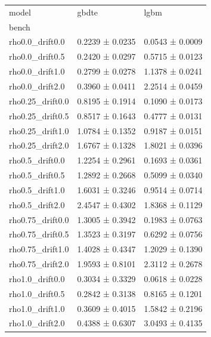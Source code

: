 \begin{tabular}{lll}
\toprule
model & gbdte & lgbm \\
bench &  &  \\
\midrule
rho0.0_drift0.0 & 0.2239 ± 0.0235 & 0.0543 ± 0.0009 \\
rho0.0_drift0.5 & 0.2420 ± 0.0297 & 0.5715 ± 0.0123 \\
rho0.0_drift1.0 & 0.2799 ± 0.0278 & 1.1378 ± 0.0241 \\
rho0.0_drift2.0 & 0.3960 ± 0.0411 & 2.2514 ± 0.0459 \\
rho0.25_drift0.0 & 0.8195 ± 0.1914 & 0.1090 ± 0.0173 \\
rho0.25_drift0.5 & 0.8517 ± 0.1643 & 0.4777 ± 0.0131 \\
rho0.25_drift1.0 & 1.0784 ± 0.1352 & 0.9187 ± 0.0151 \\
rho0.25_drift2.0 & 1.6767 ± 0.1328 & 1.8021 ± 0.0396 \\
rho0.5_drift0.0 & 1.2254 ± 0.2961 & 0.1693 ± 0.0361 \\
rho0.5_drift0.5 & 1.2892 ± 0.2668 & 0.5099 ± 0.0340 \\
rho0.5_drift1.0 & 1.6031 ± 0.3246 & 0.9514 ± 0.0714 \\
rho0.5_drift2.0 & 2.4547 ± 0.4302 & 1.8368 ± 0.1129 \\
rho0.75_drift0.0 & 1.3005 ± 0.3942 & 0.1983 ± 0.0763 \\
rho0.75_drift0.5 & 1.3523 ± 0.3197 & 0.6292 ± 0.0756 \\
rho0.75_drift1.0 & 1.4028 ± 0.4347 & 1.2029 ± 0.1390 \\
rho0.75_drift2.0 & 1.9593 ± 0.8101 & 2.3112 ± 0.2678 \\
rho1.0_drift0.0 & 0.3034 ± 0.3329 & 0.0618 ± 0.0228 \\
rho1.0_drift0.5 & 0.2842 ± 0.3138 & 0.8165 ± 0.1201 \\
rho1.0_drift1.0 & 0.3609 ± 0.4015 & 1.5842 ± 0.2196 \\
rho1.0_drift2.0 & 0.4388 ± 0.6307 & 3.0493 ± 0.4135 \\
\bottomrule
\end{tabular}
